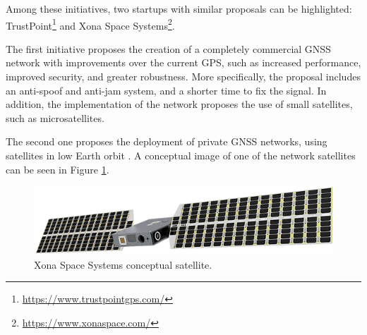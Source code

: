 Among these initiatives, two startups with similar proposals can be highlighted: TrustPoint\footnote{\href{https://www.trustpointgps.com/}{https://www.trustpointgps.com/}} and Xona Space Systems\footnote{\href{https://www.xonaspace.com/}{https://www.xonaspace.com/}}.


The first initiative proposes the creation of a completely commercial GNSS network with improvements over the current GPS, such as increased performance, improved security, and greater robustness. More specifically, the proposal includes an anti-spoof and anti-jam system, and a shorter time to fix the signal. In addition, the implementation of the network proposes the use of small satellites, such as microsatellites.


The second one proposes the deployment of private GNSS networks, using satellites in low Earth orbit \cite{reid2020} \cite{reid2023}. A conceptual image of one of the network satellites can be seen in Figure \ref{fig:xona-satellite}.

\begin{figure}[!ht]
    \begin{center}
        \includegraphics[width=0.8\columnwidth]{figures/xona-satellite}
        \caption{Xona Space Systems conceptual satellite.}
        \label{fig:xona-satellite}
    \end{center}
\end{figure}


